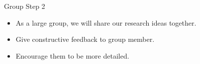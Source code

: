 \documentclass[handout]{beamer} %
\begin{document}
\begin{frame}{Group Step 2}

  \begin{itemize}
    \item As a large group, we will share our research ideas together.
    \item Give constructive feedback to group member.
    \item Encourage them to be more detailed.
  \end{itemize}

\end{frame}

%
%
\end{document}
